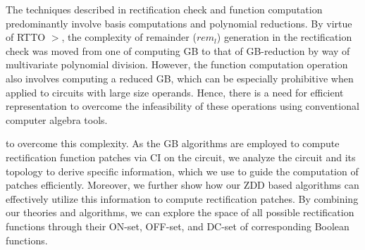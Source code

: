 The techniques described in rectification check and function computation 
predominantly involve \Grobner basis computations and polynomial reductions.
By virtue of RTTO $>$, the complexity of remainder ($rem_l$) generation 
in the rectification check was moved from one of computing GB to that of 
GB-reduction by way of multivariate polynomial division. 
However, the function computation operation also involves computing
a reduced GB, which can be especially prohibitive when applied to circuits with
large size operands. Hence, there is a need for efficient representation 
to overcome the infeasibility of these operations using conventional 
computer algebra tools. 
 
 to overcome
this complexity. As the GB algorithms are employed to compute rectification function
patches via CI on the circuit, we analyze the circuit and its topology to derive specific
information, which we use to guide the computation of patches efficiently. Moreover, we
further show how our ZDD based algorithms can effectively utilize this information
to compute rectification patches. By combining our theories and algorithms, we can explore
the space of all possible rectification functions through their ON-set, OFF-set, and DC-set
of corresponding Boolean functions.
